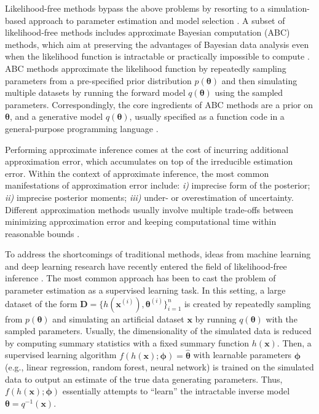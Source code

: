 \documentclass[9pt,twoside,lineno]{pnas-new}
\begin{document}
Likelihood-free methods bypass the above problems by resorting to a simulation-based approach to parameter estimation and model selection \cite{palestro2018likelihood, turner2014generalized}. A subset of likelihood-free methods includes approximate Bayesian computation (ABC) methods, which aim at preserving the advantages of Bayesian data analysis even when the likelihood function is intractable or practically impossible to compute \cite{turner2014generalized, sunnaaker2013approximate, csillery2010approximate}. ABC methods approximate the likelihood function by repeatedly sampling parameters from a pre-specified prior distribution $p(\boldsymbol{\theta})$ and then simulating multiple datasets by running the forward model $q(\boldsymbol{\theta})$ using the sampled parameters. Correspondingly, the core ingredients of ABC methods are a prior on $\boldsymbol{\theta}$, and a generative model $q(\boldsymbol{\theta})$, usually specified as a function code in a general-purpose programming language \cite{csillery2010approximate, mertens2018abrox}.

Performing approximate inference comes at the cost of incurring additional approximation error, which accumulates on top of the irreducible estimation error. Within the context of approximate inference, the most common manifestations of approximation error include: \textit{i)} imprecise form of the posterior; \textit{ii)} imprecise posterior moments; \textit{iii)} under- or overestimation of uncertainty. Different approximation methods usually involve multiple trade-offs between minimizing approximation error and keeping computational time within reasonable bounds \cite{frazier2018asymptotic, palestro2018likelihood}.

To address the shortcomings of traditional methods, ideas from machine learning and deep learning research have recently entered the field of likelihood-free inference \cite{mertens2019deep, radev2019towards, hwang2018conditional, mestdagh2018prepaid, raynal2018abc, jiang2017learning, lueckmann2017flexible, papamakarios2016fast}. The most common approach has been to cast the problem of parameter estimation as a supervised learning task. In this setting, a large dataset of the form $\boldsymbol{D} = \{h(\boldsymbol{x}^{(i)}), \boldsymbol{\theta}^{(i)}\}_{i=1}^{n}$ is created by repeatedly sampling from $p(\boldsymbol{\theta})$ and simulating an artificial dataset $\boldsymbol{x}$ by running $q(\boldsymbol{\theta})$ with the sampled parameters. Usually, the dimensionality of the simulated data is reduced by computing summary statistics  with a fixed summary function $h(\boldsymbol{x})$. Then, a supervised learning algorithm $f(h(\boldsymbol{x});\boldsymbol{\phi}) = \widehat{\boldsymbol{\theta}}$ with learnable parameters $\boldsymbol{\phi}$ (e.g., linear regression, random forest, neural network) is trained on the simulated data to output an estimate of the true data generating parameters. Thus, $f(h(\boldsymbol{x});\boldsymbol{\phi})$ essentially attempts to “learn” the intractable inverse model $\boldsymbol{\theta} = q^{-1}(\boldsymbol{x})$.
\end{document}

